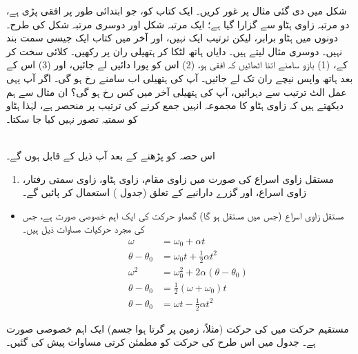 شکل  میں  دی گئی مثال پر غور کریں۔ ایک کتاب  کو، جو ابتدائی طور پر افقی پڑی ہے، دو مرتبہ  زاوی ہٹاو سے گزارا گیا ہے؛ ایک مرتبہ شکل    اور دوسری مرتبہ شکل  کی طرح۔  دونوں  میں ہٹاو  برابر، لیکن  ترتیب ایک نہیں، اور  آخر میں کتاب  ایک جیسی سمت بند نہیں۔ دوسری مثال لیتے ہیں۔ دایاں ہاتھ لٹکا کر ہتھیلی  ران پر رکھیں۔ کلائی سخت  کر کے،  (1)  بازو   سامنے اتنا اٹھائیں   کہ افقی ہو، (2)  اس کو پورا  دائیں لے جائیں، اور (3) اس کے بعد ہاتھ واپس نیچے ران تک لے جائیں۔ آپ کی ہتھیلی اب سامنے رخ ہو گی۔ اگر آپ یہی عمل الٹ ترتیب سے دہرائیں، آپ کی ہتھیلی  آخر میں کس رخ ہو گی؟ ان مثال سے ہم دیکھتے ہیں کہ زاوی  ہٹاو  کا مجموعہ انہیں جمع کرنے کی   ترتیب پر منحصر ہے، لہٰذا  ہٹاو کو سمتیہ تصور نہیں کیا جا سکتا۔

\\
اس حصہ کو پڑھنے کے بعد آپ ذیل کے قابل ہوں گے۔
\begin{enumerate}[1.]
\item
مستقل زاوی اسراع کی صورت میں زاوی مقام، زاوی ہٹاو، زاوی سمتی رفتار، زاوی اسراع، اور  گزرے دارانیے کے   تعلق  (جدول ) استعمال کر پائیں گے۔
\end{enumerate}

\begin{itemize}
\item
مستقل زاوی اسراع  (جس میں    مستقل ہو گا) گھماو حرکت کی ایک اہم   خصوصی صورت ہے، جس کی مجرد حرکیات  مساوات  ذیل ہیں۔
\begin{align*}
\omega&=\omega_0+\alpha t\\
\theta-\theta_0&=\omega_0 t+\frac{1}{2}\alpha t^2\\
\omega^2&=\omega_0^2+2\alpha(\theta-\theta_0)\\
\theta-\theta_0&=\frac{1}{2}(\omega+\omega_0)t\\
\theta-\theta_0&=\omega t-\frac{1}{2}\alpha t^2
\end{align*}
\end{itemize}

مستقیم حرکت  میں   کی حرکت (مثلاً، زمین پر گرتا ہوا جسم) ایک اہم خصوصی صورت ہے۔ جدول  میں  اس طرح کی حرکت  کو مطمئن کرتی مساوات پیش کی گئیں۔

